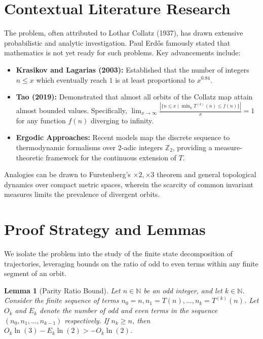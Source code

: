 \documentclass[12pt,a4paper]{article}
\newtheorem{lemma}{Lemma}
\begin{document}
\section{Contextual Literature Research}

The problem, often attributed to Lothar Collatz (1937), has drawn extensive probabilistic and analytic investigation. Paul Erd\H{o}s famously stated that mathematics is not yet ready for such problems. Key advancements include:

\begin{itemize}
    \item \textbf{Krasikov and Lagarias (2003):} Established that the number of integers $n \leq x$ which eventually reach $1$ is at least proportional to $x^{0.84}$.
    \item \textbf{Tao (2019):} Demonstrated that almost all orbits of the Collatz map attain almost bounded values. Specifically, $\lim_{x \to \infty} \frac{|\{n \leq x \mid \min_{k} T^{(k)}(n) \leq f(n) \}|}{x} = 1$ for any function $f(n)$ diverging to infinity.
    \item \textbf{Ergodic Approaches:} Recent models map the discrete sequence to thermodynamic formalisms over $2$-adic integers $\mathbb{Z}_2$, providing a measure-theoretic framework for the continuous extension of $T$.
\end{itemize}

Analogies can be drawn to Furstenberg's $\times 2, \times 3$ theorem and general topological dynamics over compact metric spaces, wherein the scarcity of common invariant measures limits the prevalence of divergent orbits.

\section{Proof Strategy and Lemmas}

We isolate the problem into the study of the finite state decomposition of trajectories, leveraging bounds on the ratio of odd to even terms within any finite segment of an orbit.

\begin{lemma}[Parity Ratio Bound]
Let $n \in \mathbb{N}$ be an odd integer, and let $k \in \mathbb{N}$. Consider the finite sequence of terms $n_0 = n, n_1 = T(n), \ldots, n_k = T^{(k)}(n)$. Let $O_k$ and $E_k$ denote the number of odd and even terms in the sequence $(n_0, n_1, \ldots, n_{k-1})$ respectively. If $n_k \geq n$, then $O_k \ln(3) - E_k \ln(2) > - O_k \ln(2)$.
\end{lemma}
\end{document}
